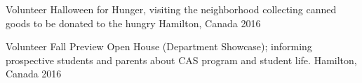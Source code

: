 

\begin{cvhonors}

  \cvhonor
    {Volunteer} %
    {Halloween for Hunger, visiting the neighborhood collecting canned goods to be donated to the hungry} %
    {Hamilton, Canada} %
    {2016} %

  \cvhonor
    {Volunteer} %
    {Fall Preview Open House (Department Showcase); informing prospective students and parents about CAS program and student life.} %
    {Hamilton, Canada} %
    {2016} %

\end{cvhonors}
